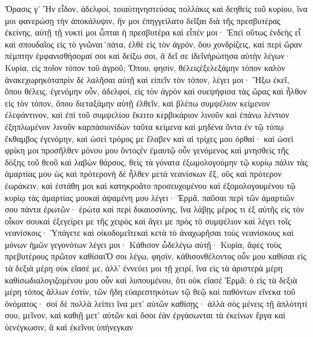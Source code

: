 Ὅρασις γ’
Ἣν εἶδον, ἀδελφοί, τοιαύτηνηστεύσας πολλάκις καὶ δεηθεὶς τοῦ κυρίου, ἵνα μοι φανερώσῃ τὴν ἀποκάλυψιν, ἣν μοι ἐπηγγείλατο δεῖξαι διὰ τῆς πρεσβυτέρας ἐκείνης, αὐτῇ τῇ νυκτί μοι ὦπται ἡ πρεσβυτέρα καὶ εἶπέν μοι· Ἐπεὶ οὕτως ἐνδεὴς εἶ καὶ σπουδαῖος εἰς τὸ γνῶναι´πάτα, ἐλθὲ εἰς τὸν ἀγρόν, ὅου χονδρίζεις, καὶ περὶ ὥραν πέμπτην ἐμφανισθήσομαί σοι καὶ δείξω σοι, ἃ δεῖ σε ἰδεῖνἠρώτησα αὐτὴν λέγων· Κυρία, εἰς ποῖον τόπον τοῦ ἀγροῦ; Ὅπου, φησίν, θέλειςἐξελεξάμην τόπον καλὸν ἀνακεχωρηκόταπρὶν δὲ λαλῆσαι αὐτῇ καὶ εἰπεῖν τὸν τόπον, λέγει μοι· Ἥξω ἐκεῖ, ὅπου θέλεις, ἐγενόμην οὖν, ἀδελφοί, εἰς τὸν ἀγρὸν καὶ συεψήφισα τὰς ὥρας καὶ ἦλθον εἰς τὸν τόπον, ὅπου διεταξάμην αὐτῇ ἐλθεῖν, καὶ βλέπω συμψέλιον κείμενον ἐλεφάντινον, καὶ ἐπὶ τοῦ συμψελίου ἔκειτο κερβικάριον λινοῦν καὶ ἐπάνω λέντιον ἐξηπλωμένον λινοῦν καρπάσιονἰδὼν ταῦτα κείμενα καὶ μηδένα ὄντα ἐν τῷ τόπῳ ἔκθαμβος ἐγενόμην, καὶ ὡσεὶ τρόμος με ἔλαβεν καὶ αἱ τρίχες μου ὀρθαί· καὶ ὡσεὶ φρίκη μοι προσῆλθεν μόνου μου ὄντοςἐν ἐμαυτῷ οὖν γενόμενος καὶ μνησθεὶς τῆς δόξης τοῦ θεοῦ καὶ λαβὼν θάρσος, θεὶς τὰ γόνατα ἐξωμολογούμην τῷ κυρίῳ πάλιν τὰς ἁμαρτίας μου ὡς καὶ πρότερονἡ δὲ ἦλθεν μετὰ νεανίσκων ἕξ, οὓς καὶ πρότερον ἑωράκειν, καὶ ἐστάθη μοι καὶ κατηκροᾶτο προσευχομένου καὶ ἐξομολογουμένου τῷ κυρίῳ τὰς ἁμαρτίας μουκαὶ ἁψαμένη μου λέγει· Ἑρμᾶ, παῦσαι περὶ τῶν ἁμαρτιῶν σου πάντα ἐρωτῶν· ἐρώτα καὶ περὶ δικαιοσύνης, ἵνα λάβῃς μέρος τι ἐξ αὐτῆς εἰς τὸν οἶκον σουκαὶ ἐξεγείρει με τῆς χειρὸς καὶ ἄγει με πρὸς τὸ συμψέλιον καὶ λέγει τοῖς νεανίσκοις· Ὑπάγετε καὶ οἰκοδομεῖτεκαὶ κετὰ τὸ ἀναχωρῆσαι τοὺς νεανίσκους καὶ μόνων ἡμῶν γεγονότων λέγει μοι· Κάθισον ὧδελέγω αὐτῇ· Κυρία, ἄφες τοὺς πρεβυτέρους πρῶτον καθίσαιὍ σοι λέγω, φησίν, κάθισονθέλοντος οὖν μου καθίσαι εἰς τὰ δεξιὰ μέρη οὐκ εἴασέ με, ἀλλ’ ἐννεύει μοι τῇ χειρί, ἵνα εἰς τὰ ἀριστερὰ μέρη καθίσωδιαλογιζομένου μου οὖν καὶ λυπουμένου, ὅτι οὐκ εἴασέ Ἑρμᾶ; ὁ εἰς τὰ δεξιὰ μέρη τόπος ἄλλων ἐστίν, τῶν ἤδη εὐαρεστηκότων τῷ θεῷ καὶ παθόντων εἵνεκα τοῦ ὀνόματος· σοὶ δὲ πολλὰ λείπει ἵνα μετ’ αὐτῶν καθίσῃς· ἀλλὰ σὸς μένεις τῇ ἁπλότητί σου, μεῖνον, καὶ καθιῇ μετ’ αὐτῶν καὶ ὅσοι ἐὰν ἐργάσωνται τὰ ἐκείνων ἔργα καὶ ὑενέγκωσιν, ἃ καὶ ἐκεῖνοι ὑπήνεγκαν
